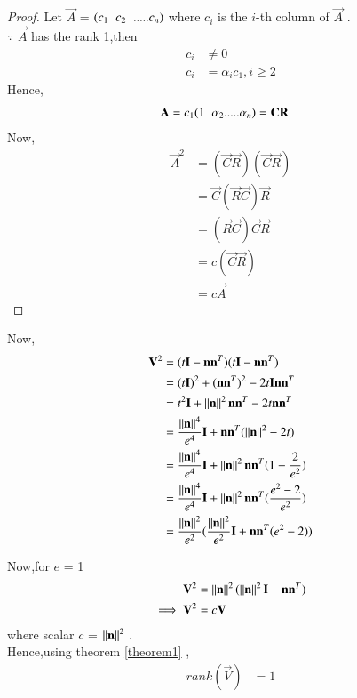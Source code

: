 \documentclass[journal,12pt,twocolumn]{IEEEtran}
\begin{document}
\begin{proof}
Let $\vec{A}$ = $(c_1 \hspace{0.2cm}  c_2 \hspace{0.2cm} ..... c_n)$ where $c_i$ is the $i$-th column of $\vec{A}$ . 
\\
$\because$ $\vec{A}$ has the rank 1,then 
\begin{align}
    c_i &\neq 0
    \\
    c_i &= \alpha_ic_1 , i\geq 2
\end{align}
Hence,
\begin{align}
    \vec{A} &= c_1(1 \hspace{0.2cm} \alpha_2 .....\alpha_n) = \vec{C}\vec{R}
\end{align}
Now,
\begin{align}
    \vec{A}^2 &= (\vec{C}\vec{R})(\vec{C}\vec{R})
    \\
    &= \vec{C}(\vec{R}\vec{C})\vec{R}
    \\
    &= (\vec{R}\vec{C})\vec{C}\vec{R}
    \\
    &= c(\vec{C}\vec{R})
    \\
    &= c\vec{A}
\end{align}
\end{proof}
Now,
\begin{align}
    \vec{V}^2 &= (t\vec{I}-\vec{n}\vec{n}^T)(t\vec{I}-\vec{n}\vec{n}^T) 
    \\
    &= (t\vec{I})^2 +(\vec{n}\vec{n}^T)^2 - 2t\vec{I}\vec{n}\vec{n}^T
    \\
    &= t^2\vec{I} + \norm{\vec{n}}^2\vec{n}\vec{n}^T - 2t\vec{n}\vec{n}^T
    \\
    &= \frac{\norm{\vec{n}}^4}{e^4}\vec{I} + \vec{n}\vec{n}^T(\norm{\vec{n}}^2-2t)
    \\
    &= \frac{\norm{\vec{n}}^4}{e^4}\vec{I} + \norm{\vec{n}}^2\vec{n}\vec{n}^T(1-\frac{2}{e^2})
    \\
    &= \frac{\norm{\vec{n}}^4}{e^4}\vec{I} + \norm{\vec{n}}^2\vec{n}\vec{n}^T(\frac{e^2-2}{e^2})
    \\
    &= \frac{\norm{\vec{n}}^2}{e^2}(\frac{\norm{\vec{n}}^2}{e^2}\vec{I} + \vec{n}\vec{n}^T(e^2-2))
\end{align}

Now,for $e$ = 1
\begin{align}
    \vec{V}^2 &= \norm{\vec{n}}^2(\norm{\vec{n}}^2\vec{I} - \vec{n}\vec{n}^T)
    \\
    \implies \vec{V}^2 &= c\vec{V}
\end{align}
where scalar $c$ = $\norm{\vec{n}}^2$ .
\\
Hence,using theorem \ref{theorem1} ,
\begin{align}
    rank(\vec{V}) &= 1
\end{align}
\end{document}
